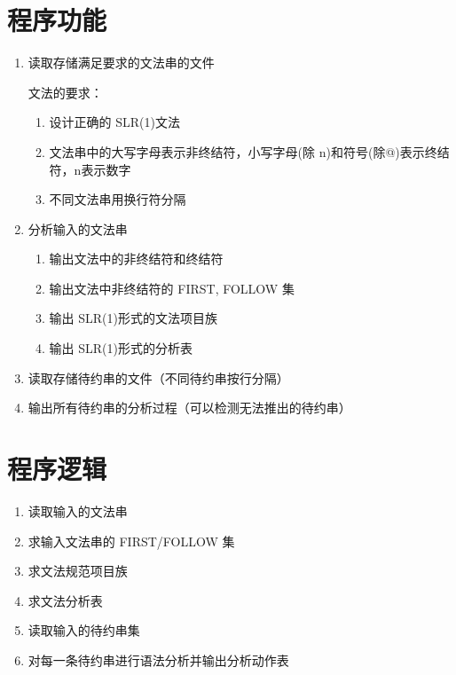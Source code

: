 \documentclass[fontset=none,UTF8,a4paper,zihao=-4]{ctexart}
\begin{document}
\section{程序功能}
\label{sec:org53df831}
\begin{enumerate}
\item 读取存储满足要求的文法串的文件

文法的要求：
\begin{enumerate}
\item 设计正确的 SLR(1)文法
\item 文法串中的大写字母表示非终结符，小写字母(除 n)和符号(除@)表示终结符，n表示数字
\item 不同文法串用换行符分隔
\end{enumerate}
\item 分析输入的文法串
\begin{enumerate}
\item 输出文法中的非终结符和终结符
\item 输出文法中非终结符的 FIRST, FOLLOW 集
\item 输出 SLR(1)形式的文法项目族
\item 输出 SLR(1)形式的分析表
\end{enumerate}
\item 读取存储待约串的文件（不同待约串按行分隔）
\item 输出所有待约串的分析过程（可以检测无法推出的待约串）
\end{enumerate}

\section{程序逻辑}
\label{sec:org38ebe3d}
\begin{enumerate}
\item 读取输入的文法串
\item 求输入文法串的 FIRST/FOLLOW 集
\item 求文法规范项目族
\item 求文法分析表
\item 读取输入的待约串集
\item 对每一条待约串进行语法分析并输出分析动作表
\end{enumerate}
\end{document}
